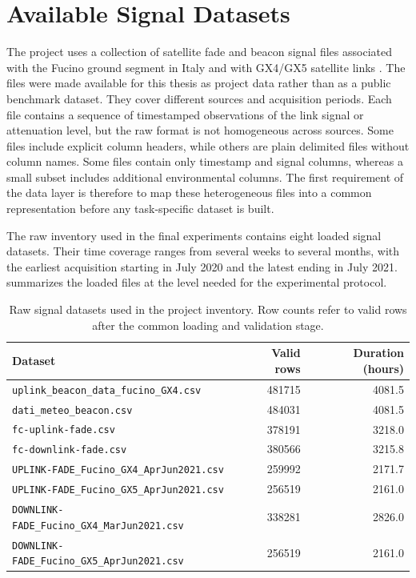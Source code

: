 \section{Available Signal Datasets}

The project uses a collection of satellite fade and beacon signal files
associated with the Fucino ground segment in Italy and with GX4/GX5 satellite
links \cite{telespazio_fucino,satbeams_gx4,satbeams_gx5}. The files were made
available for this thesis as project data rather than as a public benchmark
dataset. They cover different sources and acquisition periods. Each file
contains a sequence of timestamped observations of the link signal or
attenuation level, but the raw format is not homogeneous across sources. Some
files include explicit column headers, while others are plain delimited files
without column names. Some files contain only timestamp and signal columns,
whereas a small subset includes additional environmental columns. The first
requirement of the data layer is therefore to map these heterogeneous files
into a common representation before any task-specific dataset is built.

The raw inventory used in the final experiments contains eight loaded signal
datasets. Their time coverage ranges from several weeks to several months, with
the earliest acquisition starting in July 2020 and the latest ending in July
2021.  summarizes the loaded files at the level
needed for the experimental protocol.

\begin{table}[htbp]
  \centering
  \caption{Raw signal datasets used in the project inventory. Row counts refer
  to valid rows after the common loading and validation stage.}
  \label{tab:raw-dataset-inventory}
  \begin{tabular}{lrr}
    \toprule
    Dataset & Valid rows & Duration (hours) \\
    \midrule
    \texttt{uplink\_beacon\_data\_fucino\_GX4.csv} & 481715 & 4081.5 \\
    \texttt{dati\_meteo\_beacon.csv} & 484031 & 4081.5 \\
    \texttt{fc-uplink-fade.csv} & 378191 & 3218.0 \\
    \texttt{fc-downlink-fade.csv} & 380566 & 3215.8 \\
    \texttt{UPLINK-FADE\_Fucino\_GX4\_AprJun2021.csv} & 259992 & 2171.7 \\
    \texttt{UPLINK-FADE\_Fucino\_GX5\_AprJun2021.csv} & 256519 & 2161.0 \\
    \texttt{DOWNLINK-FADE\_Fucino\_GX4\_MarJun2021.csv} & 338281 & 2826.0 \\
    \texttt{DOWNLINK-FADE\_Fucino\_GX5\_AprJun2021.csv} & 256519 & 2161.0 \\
    \bottomrule
  \end{tabular}
\end{table}


